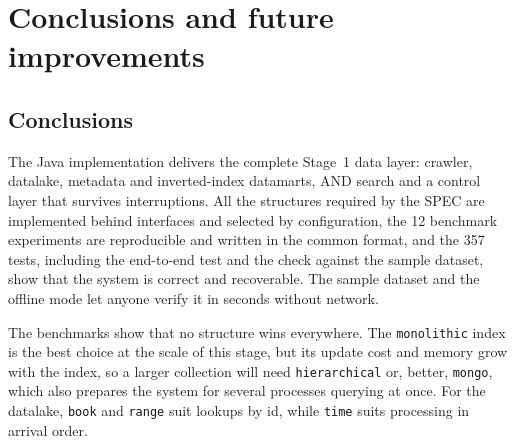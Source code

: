 \documentclass[11pt,a4paper]{article}
\newcommand{\code}[1]{\texttt{#1}}
\begin{document}
\section{Conclusions and future improvements}

\subsection{Conclusions}
The Java implementation delivers the complete Stage~1 data layer: crawler, datalake, metadata and
inverted-index datamarts, AND search and a control layer that survives interruptions. All the
structures required by the SPEC are implemented behind interfaces and selected by configuration,
the 12 benchmark experiments are reproducible and written in the common format, and the 357 tests,
including the end-to-end test and the check against the sample dataset, show that the system is
correct and recoverable. The sample dataset and the offline mode let anyone verify it in seconds
without network.

The benchmarks show that no structure wins everywhere. The \code{monolithic} index is the best
choice at the scale of this stage, but its update cost and memory grow with the index, so a larger
collection will need \code{hierarchical} or, better, \code{mongo}, which also prepares the system
for several processes querying at once. For the datalake, \code{book} and \code{range} suit lookups
by id, while \code{time} suits processing in arrival order.
\end{document}
